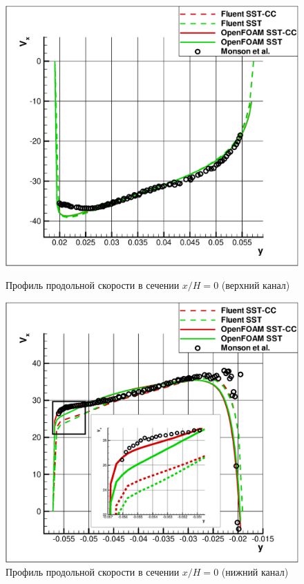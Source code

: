 \begin{figure}[ht]
	\begin{minipage}{0.475\linewidth}
		\includegraphics[scale=0.33]{xh0up}
		\caption{Профиль продольной скорости в сечении $x/H=0$ (верхний канал)}
		\label{fig:x0up}
	\end{minipage}
	\hspace{0.5em}
	\begin{minipage}{0.475\linewidth}
		\includegraphics[scale=0.33]{xh0down}
		\caption{Профиль продольной скорости в сечении $x/H=0$ (нижний канал)}
		\label{fig:x0down}
	\end{minipage}
\end{figure}
